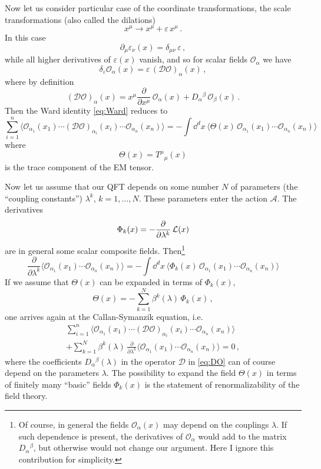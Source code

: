 Now let us consider particular case of the coordinate transformations, the scale
transformations (also called the dilations)
\[
x^\mu\to x^\mu+\varepsilon\,x^\mu\,.
\]
In this case
\[
\partial_\mu\varepsilon_\nu(x)=\delta_{\mu\nu}\,\varepsilon\,,
\]
while all higher derivatives of $\varepsilon(x)$ vanish, and so for scalar fields
$\mathcal O_\alpha$ we have
\[
\delta_\varepsilon\mathcal O_\alpha(x)=\varepsilon\,(\mathcal D\mathcal O)_\alpha(x)\,,
\]
where by definition
\begin{equation}\label{eq:DO}
(\mathcal D\mathcal O)_\alpha(x)=x^\mu\frac\partial{\partial x^\mu}\,\mathcal O_\alpha(x)+D_\alpha{}^\beta\,\mathcal O_\beta(x)\,.
\end{equation}
Then the Ward identity \eqref{eq:Ward} reduces to
\begin{equation}\label{eq:WardTheta}
\sum_{i=1}^n\bigl\langle\mathcal O_{\alpha_1}(x_1)\cdots(\mathcal D\mathcal O)_{\alpha_i}(x_i)\cdots\mathcal O_{\alpha_n}(x_n)\bigr\rangle
=-\int \dd^dx\,\bigl\langle\Theta(x)\,\mathcal O_{\alpha_1}(x_1)\cdots\mathcal O_{\alpha_n}(x_n)\bigr\rangle
\end{equation}
where
\[
\Theta(x)=T^\mu{}_\mu(x)
\]
is the trace component of the EM tensor.

Now let us assume that our QFT depends on some number $N$ of parameters (the
``coupling constants'') $\lambda^k$, $k=1,\dots,N$. These parameters enter the
action $\mathcal A$. The derivatives
\[
\Phi_k(x)=-\frac\partial{\partial\lambda^k}\,\mathcal{L}(x)
\]
are in general some scalar composite fields. Then\footnote{Of course, in general
the fields $\mathcal O_\alpha(x)$ may depend on the couplings $\lambda$. If such
dependence is present, the derivatives of $\mathcal O_\alpha$ would add to the
matrix $D_\alpha{}^\beta$, but otherwise would not change our argument. Here I ignore
this contribution for simplicity.}
\[
\frac\partial{\partial\lambda^k}\bigl\langle\mathcal O_{\alpha_1}(x_1)\cdots\mathcal O_{\alpha_n}(x_n)\bigr\rangle
=-\int \dd^dx\,\bigl\langle\Phi_k(x)\,\mathcal O_{\alpha_1}(x_1)\cdots\mathcal O_{\alpha_n}(x_n)\bigr\rangle
\]
If we assume that $\Theta(x)$ can be expanded in terms of $\Phi_k(x)$,
\begin{equation}\label{eq:ThetaBeta}
\Theta(x)=-\sum_{k=1}^N\beta^k(\lambda)\,\Phi_k(x)\,,
\end{equation}
one arrives again at the Callan-Symanzik equation, i.e.
\begin{multline}\label{eq:CSTheta}
\sum_{i=1}^n\bigl\langle\mathcal O_{\alpha_1}(x_1)\cdots(\mathcal D\mathcal O)_{\alpha_i}(x_i)\cdots\mathcal O_{\alpha_n}(x_n)\bigr\rangle\\
+\sum_{k=1}^N\beta^k(\lambda)\,\frac\partial{\partial\lambda^k}\bigl\langle\mathcal O_{\alpha_1}(x_1)\cdots\mathcal O_{\alpha_n}(x_n)\bigr\rangle=0\,,
\end{multline}
where the coefficients $D_\alpha{}^\beta(\lambda)$ in the operator $\mathcal D$ in
\eqref{eq:DO} can of course depend on the parameters $\lambda$. The possibility to
expand the field $\Theta(x)$ in terms of finitely many ``basic'' fields
$\Phi_k(x)$ is the statement of renormalizability of the field theory.

